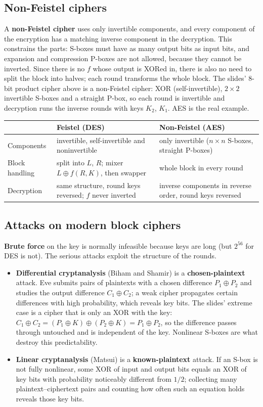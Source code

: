 \subsection{Non-Feistel ciphers}
A \textbf{non-Feistel cipher} uses only invertible components, and every component of the encryption has a matching inverse component in the decryption. This constrains the parts: S-boxes must have as many output bits as input bits, and expansion and compression P-boxes are not allowed, because they cannot be inverted. Since there is no $f$ whose output is XORed in, there is also no need to split the block into halves; each round transforms the whole block. The slides' 8-bit product cipher above is a non-Feistel cipher: XOR (self-invertible), $2 \times 2$ invertible S-boxes and a straight P-box, so each round is invertible and decryption runs the inverse rounds with keys $K_2$, $K_1$. AES is the real example.

\begin{center}\small
\begin{tabularx}{\textwidth}{@{}l X X@{}}
\toprule
 & \textbf{Feistel} (DES) & \textbf{Non-Feistel} (AES)\\
\midrule
Components & invertible, self-invertible and noninvertible & only invertible ($n \times n$ S-boxes, straight P-boxes)\\
Block handling & split into $L$, $R$; mixer $L \oplus f(R, K)$, then swapper & whole block in every round\\
Decryption & same structure, round keys reversed; $f$ never inverted & inverse components in reverse order, round keys reversed\\
\bottomrule
\end{tabularx}
\end{center}

\subsection{Attacks on modern block ciphers}
\textbf{Brute force} on the key is normally infeasible because keys are long (but $2^{56}$ for DES is not). The serious attacks exploit the structure of the rounds.
\begin{itemize}
  \item \textbf{Differential cryptanalysis} (Biham and Shamir) is a \textbf{chosen-plaintext} attack. Eve submits pairs of plaintexts with a chosen difference $P_1 \oplus P_2$ and studies the output difference $C_1 \oplus C_2$; a weak cipher propagates certain differences with high probability, which reveals key bits. The slides' extreme case is a cipher that is only an XOR with the key: $C_1 \oplus C_2 = (P_1 \oplus K) \oplus (P_2 \oplus K) = P_1 \oplus P_2$, so the difference passes through untouched and is independent of the key. Nonlinear S-boxes are what destroy this predictability.
  \item \textbf{Linear cryptanalysis} (Matsui) is a \textbf{known-plaintext} attack. If an S-box is not fully nonlinear, some XOR of input and output bits equals an XOR of key bits with probability noticeably different from $1/2$; collecting many plaintext--ciphertext pairs and counting how often such an equation holds reveals those key bits.
\end{itemize}

